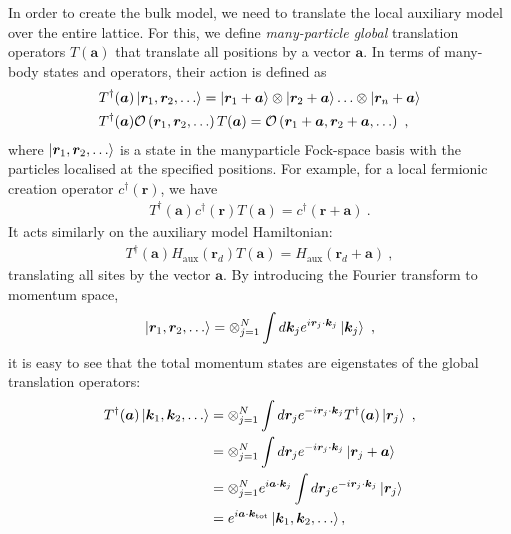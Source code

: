 In order to create the bulk model, we need to translate the local auxiliary model over the entire lattice. For this, we define {\it many-particle global} translation operators \(T({\bm a})\) that translate all positions by a vector \({\bm a}\). In terms of many-body states and operators, their action is defined as ~\cite{Calais_1995,stoyanova}
\begin{equation}\begin{aligned}\label{translationDefinition}
	&T^\dagger({\bm a}) \ket{{\bm r}_1, {\bm r}_2,\ldots} = \ket{{\bm r}_1 + {\bm a}}\otimes\ket{{\bm r}_2 + {\bm a}}\ldots\otimes\ket{{\bm r}_n + {\bm a}}\\
	&T^\dagger({\bm a}) \mathcal{O}\left({\bm r}_1, {\bm r}_2,\ldots\right)T({\bm a}) = \mathcal{O}\left({\bm r}_1 + {\bm a}, {\bm r}_2 + {\bm a},\ldots\right)~,
\end{aligned}\end{equation}
where \(\ket{{\bm r}_1, {\bm r}_2,\ldots}\) is a state in the manyparticle Fock-space basis with the particles localised at the specified positions. For example, for a local fermionic creation operator \(c^\dagger({\bm r})\), we have 
\begin{equation}\begin{aligned}
	T^\dagger({\bm a}) c^\dagger({\bm r}) T({\bm a}) = c^\dagger({\bm r} + {\bm a})~.
\end{aligned}\end{equation}
It acts similarly on the auxiliary model Hamiltonian:
\begin{equation}\begin{aligned}
	T^\dagger({\bm a}){H}_\text{aux}({\bm r}_d)T({\bm a}) = {H}_\text{aux}({\bm r}_d + {\bm a})~,
\end{aligned}\end{equation}
translating all sites by the vector \({\bm a}\). By introducing the Fourier transform to momentum space,
\begin{equation}\begin{aligned}
	\ket{{\bm r}_1, {\bm r}_2,\ldots} = \otimes_{j=1}^N \int d{\bm k}_j e^{i {\bm r}_j\cdot{\bm k}_j} \ket{{\bm k}_j}~,
\end{aligned}\end{equation}
it is easy to see that the total momentum states are eigenstates of the global translation operators:
\begin{equation}\begin{aligned}
	T^\dagger({\bm a})\ket{{\bm k}_1, {\bm k}_2,\ldots} &= \otimes_{j=1}^N \int d{\bm r}_j e^{-i {\bm r}_j\cdot{\bm k}_j} T^\dagger({\bm a})\ket{{\bm r}_j}~,\\
							    &=\otimes_{j=1}^N \int d{\bm r}_j e^{-i {\bm r}_j\cdot{\bm k}_j} \ket{{\bm r}_j + {\bm a}}\\
							    &=\otimes_{j=1}^N e^{i {\bm a}\cdot{\bm k}_j}\int d{\bm r}_j e^{-i {\bm r}_j\cdot{\bm k}_j} \ket{{\bm r}_j}\\
							    &=e^{i {\bm a}\cdot{\bm k}_\text{tot}}\ket{{\bm k}_1, {\bm k}_2,\ldots},
\end{aligned}\end{equation}
